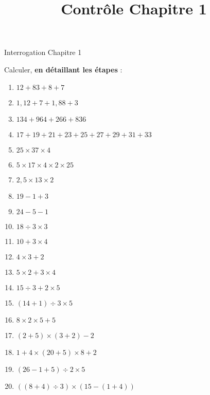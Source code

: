 \documentclass[14 pt]{extarticle}
\title{Contrôle Chapitre 1}
\date{}
\theoremstyle{plain}
\begin{document}
\begin{center}{\Large Interrogation Chapitre 1}\\ 
 \end{center}
 
 

Calculer, \textbf{en détaillant les étapes} : \begin{enumerate}
\item $12 + 83 + 8 + 7$
\item $1,12 + 7 + 1, 88 + 3$
\item $134 + 964 + 266 + 836$
\item $ 17 + 19 + 21 + 23 + 25 + 27 + 29 + 31 + 33 $
\item $25 \times 37 \times 4$ 
\item $5 \times 17\times 4 \times 2 \times 25$
\item $ 2,5 \times 13 \times 2 $
\item $ 19 - 1 + 3$
\item $ 24 - 5 - 1$
\item $18\div 3 \times 3$
\item $10 + 3 \times 4$
\item $ 4 \times 3 + 2$
\item $ 5 \times 2 + 3 \times 4$
\item $ 15 \div 3 + 2 \times 5$
\item $ (14 +1)\div 3 \times 5$
\item $ 8 \times 2 \times 5 + 5$
\item $(2+5) \times (3+2) - 2$
\item $ 1 + 4 \times (20 + 5) \times 8 + 2$
\item $ (26 - 1 + 5)\div 2 \times 5$
\item $ ( ( 8 + 4 ) \div 3 ) \times ( 15 - ( 1 + 4 ) )$
\end{enumerate}

 	
\end{document}
